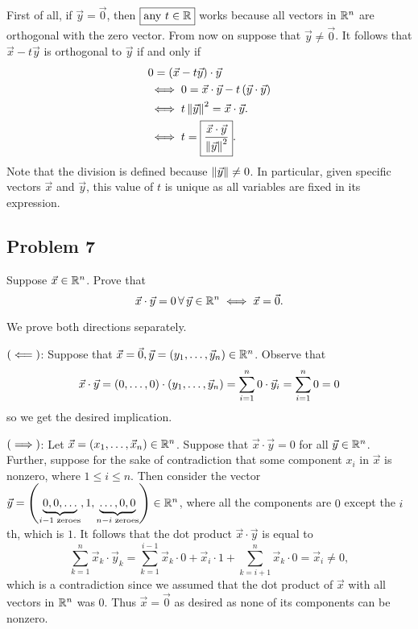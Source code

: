 \documentclass[main.tex]{subfiles}
\begin{document}
\begin{soln}
    First of all, if $\vec{y} = \vec{0}$, then $\boxed{\text{any }t\in \mathbb R}$ works because all vectors in $\mathbb R^n$ are orthogonal with the zero vector. From now on suppose that $\vec{y} \neq \vec{0}$. It follows that $\vec{x} - t\vec{y}$ is orthogonal to $\vec{y}$ if and only if
    \begin{align*}
    &0 = \left( \vec{x} - t\vec{y} \right) \cdot \vec{y} \\
    &\iff 0 = \vec{x} \cdot \vec{y} - t\left( \vec{y}\cdot \vec{y} \right) \\
    &\iff t\left\lVert \vec{y} \right\rVert^2 = \vec{x} \cdot \vec{y}. \\
    &\iff t = \boxed{\frac{\vec{x} \cdot \vec{y}}{\left\lVert \vec{y} \right\rVert^2}}.
    \end{align*}
    Note that the division is defined because $\left\lVert \vec{y} \right\rVert \neq 0$. In particular, given specific vectors $\vec{x}$ and $\vec{y}$, this value of $t$ is unique as all variables are fixed in its expression.
\end{soln}
\eject

\subsection{Problem 7}
\begin{claim}
    Suppose $\vec{x} \in\mathbb R^n$. Prove that
    \[\vec{x} \cdot \vec{y} = 0 \,\forall\, \vec{y} \in\mathbb R^n \iff \vec{x} = \vec{0}.\]
\end{claim}

\begin{soln}
    We prove both directions separately.
    
    $\left( \impliedby \right)$: Suppose that $\vec{x} = \vec{0}, \vec{y} = \left( y_1, \ldots , \vec{y}_n \right)\in \mathbb R^n$. Observe that
    \[\vec{x}\cdot \vec{y} = \left( 0, \ldots , 0 \right) \cdot \left( y_1, \ldots , \vec{y}_n \right) = \sum_{i = 1}^n 0\cdot \vec{y}_i = \sum_{i = 1}^n 0 = 0\]
    so we get the desired implication.

    $\left( \implies \right)$: Let $\vec{x} = \left( x_1, \ldots , \vec{x}_n \right)\in \mathbb R^n$. Suppose that $\vec{x}\cdot \vec{y} = 0$ for all $\vec{y}\in \mathbb R^n$. Further, suppose for the sake of contradiction that some component $x_i$ in $\vec{x}$ is nonzero, where $1\le i \le n$. Then consider the vector $\vec{y} = \left( \underbrace{0, 0, \ldots}_{i - 1\text{ zeroes}}, 1 , \underbrace{\ldots, 0, 0}_{n - i\text{ zeroes}} \right)\in \mathbb R^n$, where all the components are $0$ except the $i$th, which is $1$. It follows that the dot product $\vec{x}\cdot \vec{y}$ is equal to
    \[\sum_{k = 1}^n \vec{x}_k\cdot \vec{y}_k = \sum_{k = 1}^{i - 1} \vec{x}_k \cdot 0 + \vec{x}_i \cdot 1 + \sum_{k = i + 1}^n \vec{x}_k \cdot 0 = \vec{x}_i \neq 0,\]
    which is a contradiction since we assumed that the dot product of $\vec{x}$ with all vectors in $\mathbb R^n$ was $0$. Thus $\vec{x} = \vec{0}$ as desired as none of its components can be nonzero.
\end{soln}
\eject
\end{document}
